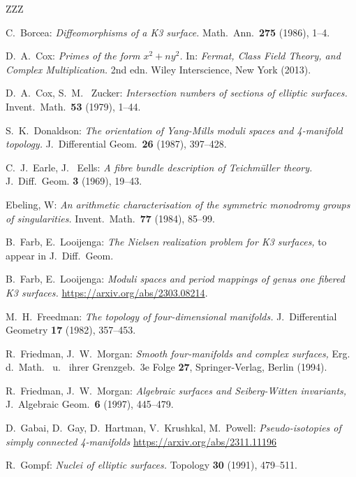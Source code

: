 \documentclass[10pt,letterpaper]{amsart}
\numberwithin{equation}{section}
\theoremstyle{remark}
\begin{document}
\begin{thebibliography}{ZZZ}

C.~Borcea:
\textit{Diffeomorphisms of a K3 surface.}
Math.\ Ann.\ \textbf{275} (1986), 1--4.

D.~A.~Cox:
\textit{Primes of the form $x^2 + ny^2$.} In: \textsl{Fermat, Class Field Theory, and Complex Multiplication.} 2nd edn. Wiley Interscience, New York (2013).

D.~A.~Cox, S.~M.~ Zucker:
\textit{Intersection numbers of sections of elliptic surfaces.} 
Invent.\ Math.\ \textbf{53} (1979), 1--44.

S.~K.~Donaldson:
\textit{The orientation of Yang-Mills moduli spaces and 4-manifold topology.}
J.\ Differential Geom.\ \textbf{26} (1987), 397--428. 

C.~J.~Earle, J.~ Eells:
\textsl{A fibre bundle description of Teichm\"uller theory.} J.~Diff.~Geom. \textbf{3} (1969), 19--43.

Ebeling, W:
\textit{An arithmetic characterisation of the symmetric monodromy groups of singularities.}
Invent.\ Math.\  \textbf{77} (1984), 85--99.

B.~Farb, E.~Looijenga:
\textit{The Nielsen realization problem for K3 surfaces,} to appear in J.~Diff.~Geom.

B.~Farb, E.~Looijenga:
\textit{Moduli spaces and period mappings of genus one fibered 
K3 surfaces.} \url{https://arxiv.org/abs/2303.08214}. 

M.~H.~Freedman:
\textit{The topology of four-dimensional manifolds.}
J.\ Differential Geometry \textbf{17} (1982), 357--453. 

R.~Friedman, J.~W.~Morgan:
\textsl{Smooth four-manifolds and complex surfaces,} 
Erg.~ d.~Math.~ u.~ ihrer Grenzgeb.\ 3e Folge \textbf{27}, 
Springer-Verlag, Berlin (1994).

R.~Friedman, J.~W.~Morgan:
\textit{Algebraic surfaces and Seiberg-Witten invariants,}
J.\ Algebraic Geom.\ \textbf{6} (1997), 445--479.

D.~Gabai, D.~Gay, D.~Hartman, V.~Krushkal, M.~Powell:
\textit{Pseudo-isotopies of simply connected 4-manifolds}
\url{https://arxiv.org/abs/2311.11196}

R.~Gompf:
\textit{Nuclei of elliptic surfaces.} Topology \textbf{30} (1991), 
479--511.


\end{thebibliography}
\end{document}
